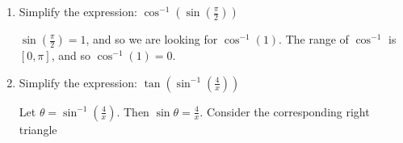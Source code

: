 \documentclass[handout,nooutcomes]{ximera}
\begin{document}
			
			
\begin{problem}
	
			\begin{enumerate}
			
			\item  Simplify the expression:  $\cos^{-1} \left( \sin \left( \frac{\pi }{2} \right) \right) $ 
			
			 \begin{freeResponse}			 
			 $ \sin \left( \frac{\pi}{2} \right) = 1$, and so we are looking for $\cos^{-1}(1)$.  The range of $\cos^{-1}$ is $[0, \pi]$, and so $\cos^{-1} (1) = 0$.  
			 \end{freeResponse}
			 
			 
			 
			 
			 
			 
			
			\item  Simplify the expression:  $ \tan \left( \sin^{-1} \left( \frac{4}{x} \right) \right) $ 
			
			 \begin{freeResponse}			 
			 Let $\theta = \sin^{-1} \left( \frac{4}{x} \right) $.  Then $\sin \theta = \frac{4}{x}$.  Consider the corresponding right triangle
			 

\end{freeResponse}
\end{enumerate}
\end{problem}
\end{document}
